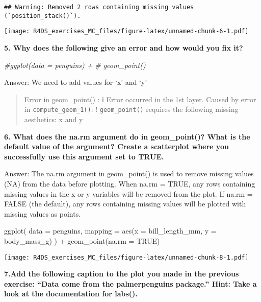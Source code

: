 \documentclass[
]{article}
\newenvironment{Shaded}{\begin{snugshade}}{\end{snugshade}}
\newcommand{\AttributeTok}[1]{\textcolor[rgb]{0.77,0.63,0.00}{#1}}
\newcommand{\CommentTok}[1]{\textcolor[rgb]{0.56,0.35,0.01}{\textit{#1}}}
\newcommand{\ConstantTok}[1]{\textcolor[rgb]{0.00,0.00,0.00}{#1}}
\newcommand{\FunctionTok}[1]{\textcolor[rgb]{0.00,0.00,0.00}{#1}}
\newcommand{\NormalTok}[1]{#1}
\newcommand{\SpecialCharTok}[1]{\textcolor[rgb]{0.00,0.00,0.00}{#1}}
\begin{document}
\begin{verbatim}
## Warning: Removed 2 rows containing missing values (`position_stack()`).
\end{verbatim}

\texttt{[image: R4DS\_exercises\_MC\_files/figure-latex/unnamed-chunk-6-1.pdf]}

\textbf{5. Why does the following give an error and how would you fix
it?}

\begin{Shaded}
\begin{Highlighting}[]
\CommentTok{\#ggplot(data = penguins) + }
\CommentTok{\#  geom\_point()}
\end{Highlighting}
\end{Shaded}

Answer: We need to add values for `x' and `y'

\begin{quote}
Error in geom\_point() : ℹ Error occurred in the 1st layer. Caused by
error in \texttt{compute\_geom\_1()}: ! \texttt{geom\_point()} requires
the following missing aesthetics: x and y
\end{quote}

\textbf{6. What does the na.rm argument do in geom\_point()? What is the
default value of the argument? Create a scatterplot where you
successfully use this argument set to TRUE.}

Answer: The na.rm argument in geom\_point() is used to remove missing
values (NA) from the data before plotting. When na.rm = TRUE, any rows
containing missing values in the x or y variables will be removed from
the plot. If na.rm = FALSE (the default), any rows containing missing
values will be plotted with missing values as points.

\begin{Shaded}
\begin{Highlighting}[]
\FunctionTok{ggplot}\NormalTok{(}
  \AttributeTok{data =}\NormalTok{ penguins,}
  \AttributeTok{mapping =} \FunctionTok{aes}\NormalTok{(}\AttributeTok{x =}\NormalTok{ bill\_length\_mm, }\AttributeTok{y =}\NormalTok{ body\_mass\_g)}
\NormalTok{) }\SpecialCharTok{+}
  \FunctionTok{geom\_point}\NormalTok{(}\AttributeTok{na.rm =} \ConstantTok{TRUE}\NormalTok{)}
\end{Highlighting}
\end{Shaded}

\texttt{[image: R4DS\_exercises\_MC\_files/figure-latex/unnamed-chunk-8-1.pdf]}

\textbf{7.Add the following caption to the plot you made in the previous
exercise: ``Data come from the palmerpenguins package.'' Hint: Take a
look at the documentation for labs().}
\end{document}
